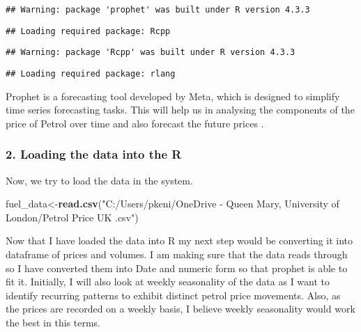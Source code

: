 \documentclass[
]{article}
\newenvironment{Shaded}{\begin{snugshade}}{\end{snugshade}}
\newcommand{\AttributeTok}[1]{\textcolor[rgb]{0.13,0.29,0.53}{#1}}
\newcommand{\FunctionTok}[1]{\textcolor[rgb]{0.13,0.29,0.53}{\textbf{#1}}}
\newcommand{\NormalTok}[1]{#1}
\newcommand{\OtherTok}[1]{\textcolor[rgb]{0.56,0.35,0.01}{#1}}
\newcommand{\SpecialCharTok}[1]{\textcolor[rgb]{0.81,0.36,0.00}{\textbf{#1}}}
\newcommand{\StringTok}[1]{\textcolor[rgb]{0.31,0.60,0.02}{#1}}
\begin{document}
\begin{verbatim}
## Warning: package 'prophet' was built under R version 4.3.3
\end{verbatim}

\begin{verbatim}
## Loading required package: Rcpp
\end{verbatim}

\begin{verbatim}
## Warning: package 'Rcpp' was built under R version 4.3.3
\end{verbatim}

\begin{verbatim}
## Loading required package: rlang
\end{verbatim}

Prophet is a forecasting tool developed by Meta, which is designed to
simplify time series forecasting tasks. This will help us in analysing
the components of the price of Petrol over time and also forecast the
future prices .

\hypertarget{loading-the-data-into-the-r}{%
\subsubsection{2. Loading the data into the
R}\label{loading-the-data-into-the-r}}

Now, we try to load the data in the system.

\begin{Shaded}
\begin{Highlighting}[]
\NormalTok{fuel\_data}\OtherTok{\textless{}{-}}\FunctionTok{read.csv}\NormalTok{(}\StringTok{"C:/Users/pkeni/OneDrive {-} Queen Mary, University of London/Petrol Price UK .csv"}\NormalTok{)}
\end{Highlighting}
\end{Shaded}

Now that I have loaded the data into R my next step would be converting
it into dataframe of prices and volumes. I am making sure that the data
reads through so I have converted them into Date and numeric form so
that prophet is able to fit it. Initially, I will also look at weekly
seasonality of the data as I want to identify recurring patterns to
exhibit distinct petrol price movements. Also, as the prices are
recorded on a weekly basis, I believe weekly seasonality would work the
best in this terms.

\begin{Shaded}
\end{Shaded}
\end{document}
